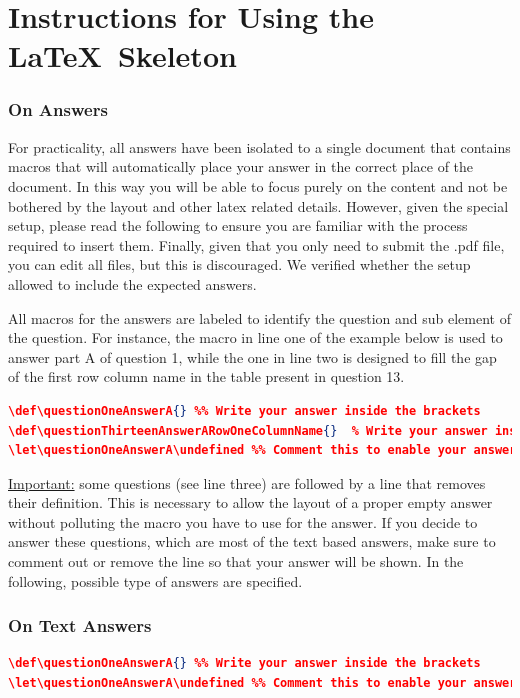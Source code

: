 
\section{Instructions for Using the \LaTeX\ Skeleton}
\label{sec:skeleton_instructions}

\subsubsection*{On Answers}
For practicality, all answers have been isolated to a single document that contains macros that will automatically place your answer in the correct place of the document.  In this way you will be able to focus purely on the content and not be bothered by the layout and other latex related details.  However, given the special setup, please read the following to ensure you are familiar with the process required to insert them.  Finally, given that you only need to submit the .pdf file, you can edit all files, but this is discouraged.  We verified whether the setup allowed to include the expected answers. 

All macros for the answers are labeled to identify the question and sub element of the question.  For instance, the macro in line one of the example below is used to answer part A of question 1, while the one in line two is designed to fill the gap of the first row column name in the table present in question 13.  
\begin{lstlisting}[language=json,basicstyle=\ttfamily\footnotesize,numbersep=5pt,frame=trBL,framexleftmargin=1.5em]
\def\questionOneAnswerA{} %% Write your answer inside the brackets
\def\questionThirteenAnswerARowOneColumnName{}	% Write your answer inside the brackets
\let\questionOneAnswerA\undefined %% Comment this to enable your answer
\end{lstlisting}

\underline{Important:} some questions (see line three) are followed by a line that removes their definition.  This is necessary to allow the layout of a proper empty answer without polluting the macro you have to use for the answer.  If you decide to answer these questions, which are most of the text based answers, make sure to comment out or remove the line so that your answer will be shown.  In the following, possible type of answers are specified.


\subsubsection*{On Text Answers}
\begin{lstlisting}[language=json,basicstyle=\ttfamily\footnotesize,numbersep=5pt,frame=trBL,framexleftmargin=1.5em]
\def\questionOneAnswerA{} %% Write your answer inside the brackets
\let\questionOneAnswerA\undefined %% Comment this to enable your answer
\end{lstlisting}

